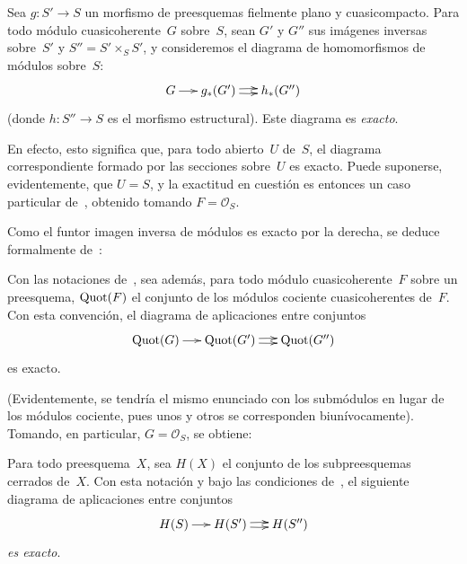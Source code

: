 \begin{corollaire}
\label{VIII.1.7}
%
Sea $g\colon S'\to S$ un morfismo de preesquemas fielmente plano y
cuasicompacto. Para todo módulo cuasicoherente~$G$ sobre~$S$, sean $G'$ y
$G''$ sus imágenes inversas sobre~$S'$ y $S''=S'\times_{S}S'$, y
consideremos el diagrama de homomorfismos de módulos sobre~$S$:
$$
\xymatrix@C=.5cm{G\ar[r] & g_*(G')\ar@/^2pt/[r]\ar@/_2pt/[r] & h_*(G'')}
$$
(donde $h\colon S''\to S$ es el morfismo estructural). Este diagrama es
\emph{exacto}.
\end{corollaire}

En
efecto, esto significa que, para todo abierto~$U$ de~$S$, el diagrama
correspondiente formado por las secciones sobre~$U$ es exacto. Puede
suponerse, evidentemente, que $U=S$, y la exactitud en cuestión es
entonces un caso particular de~, obtenido tomando
$F=\mathcal{O}_{S}$.

Como el funtor imagen inversa de módulos es exacto por la derecha, se
deduce formalmente de~:

\begin{corollaire}
\label{VIII.1.8}
%
Con las notaciones de~, sea además, para todo módulo
cuasicoherente~$F$ sobre un preesquema, $\operatorname{Quot}(F)$ el conjunto de los
módulos cociente cuasicoherentes de~$F$. Con esta convención, el diagrama
de aplicaciones entre conjuntos
$$
\xymatrix@C=.5cm{\Quot(G)\ar[r] & \Quot(G')\ar@/^2pt/[r]\ar@/_2pt/[r] &
\Quot(G'')}
$$
es exacto.
\end{corollaire}

(Evidentemente, se tendría el mismo enunciado con los submódulos en lugar
de los módulos cociente, pues unos y otros se corresponden
biunívocamente). Tomando, en particular, $G=\mathcal{O}_{S}$, se obtiene:

\begin{corollaire}
\label{VIII.1.9}
%
Para todo preesquema~$X$, sea $H(X)$ el conjunto de los subpreesquemas
cerrados de~$X$. Con esta notación y bajo las condiciones
de~, el siguiente diagrama de aplicaciones entre conjuntos
$$
\xymatrix@C=.5cm{H(S)\ar[r] & H(S')\ar@/^2pt/[r]\ar@/_2pt/[r] & H(S'')}
$$
\emph{es exacto}.
\end{corollaire}

